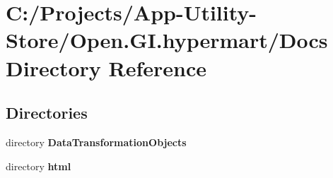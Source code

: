 \section{C\+:/\+Projects/\+App-\/\+Utility-\/\+Store/\+Open.G\+I.\+hypermart/\+Docs Directory Reference}
\label{dir_62cdaec309f188075b3123d4cb06e752}
\subsection*{Directories}
\begin{DoxyCompactItemize}
\item 
directory \textbf{ Data\+Transformation\+Objects}
\item 
directory \textbf{ html}
\end{DoxyCompactItemize}
